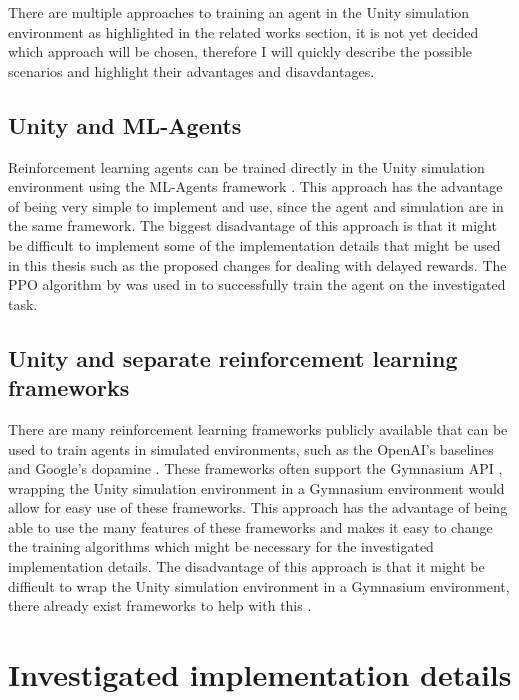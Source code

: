 There are multiple approaches to training an agent in the Unity simulation environment as highlighted in the related works section, it is not yet decided which approach will be chosen, therefore I will quickly describe the possible scenarios and highlight their advantages and disavdantages.

\subsection*{Unity and ML-Agents}

Reinforcement learning agents can be trained directly in the Unity simulation environment using the ML-Agents framework \autocite{mlagents}. This approach has the advantage of being very simple to implement and use, since the agent and simulation are in the same framework. The biggest disadvantage of this approach is that it might be difficult to implement some of the implementation details that might be used in this thesis such as the proposed changes for dealing with delayed rewards. 
The PPO algorithm by \autocite{mlagents} was used in \autocite{maximilian} to successfully train the agent on the investigated task.

\subsection*{Unity and separate reinforcement learning frameworks}

There are many reinforcement learning frameworks publicly available that can be used to train agents in simulated environments, such as the OpenAI's baselines \autocite{sb3} and Google's dopamine \autocite{dopamine}. These frameworks often support the Gymnasium API \autocite{gymnasium}, wrapping the Unity simulation environment in a Gymnasium environment would allow for easy use of these frameworks. This approach has the advantage of being able to use the many features of these frameworks and makes it easy to change the training algorithms which might be necessary for the investigated implementation details. The disadvantage of this approach is that it might be difficult to wrap the Unity simulation environment in a Gymnasium environment, there already exist frameworks to help with this \autocite{peacefulpie}.




\section{Investigated implementation details}


